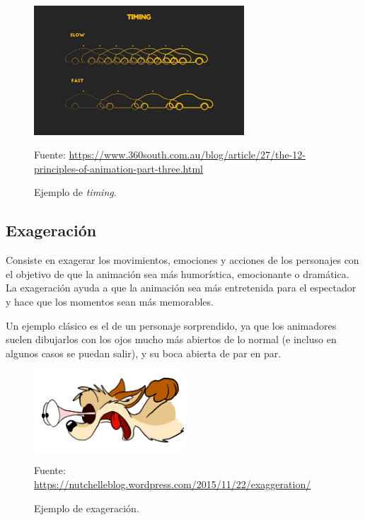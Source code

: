 \documentclass{article}
\begin{document}
\begin{figure}[H]
    \centering
    \includegraphics[width=0.7\textwidth]{imagenes/image-9_timing.jpg}
    \caption{Ejemplo de \textit{timing}.}
    \vspace{10pt}
    \footnotesize{Fuente: \url{https://www.360south.com.au/blog/article/27/the-12-principles-of-animation-part-three.html}}
\end{figure}

\subsection{Exageración}

Consiste en exagerar los movimientos, emociones y acciones de los personajes con el objetivo de que la animación sea más humorística, emocionante o dramática. La exageración ayuda a que la animación sea más entretenida para el espectador y hace que los momentos sean más memorables.

\bigskip

Un ejemplo clásico es el de un personaje sorprendido, ya que los animadores suelen dibujarlos con los ojos mucho más abiertos de lo normal (e incluso en algunos casos se puedan salir), y su boca abierta de par en par.

\begin{figure}[H]
    \centering
    \includegraphics[width=0.5\textwidth]{imagenes/080104_eyes.jpg}
    \caption{Ejemplo de exageración.}
    \vspace{10pt}
    \footnotesize{Fuente: \url{https://nutchelleblog.wordpress.com/2015/11/22/exaggeration/}}
\end{figure}
\end{document}
